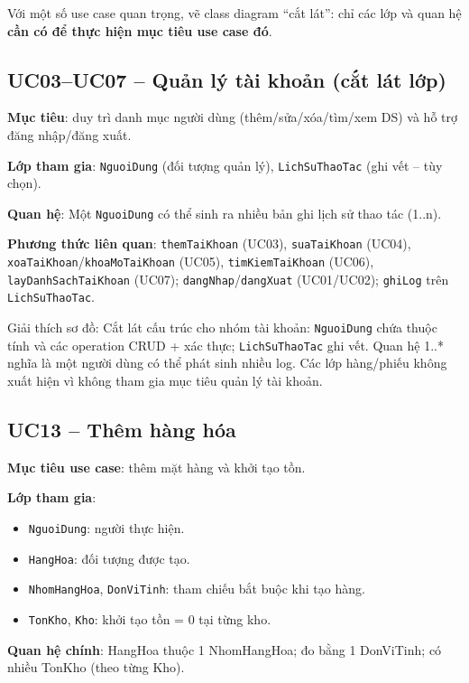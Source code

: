 Với một số use case quan trọng, vẽ class diagram ``cắt lát'': chỉ các lớp và quan hệ \textbf{cần có để thực hiện mục tiêu use case đó}.

\subsection{UC03--UC07 -- Quản lý tài khoản (cắt lát lớp)}

\textbf{Mục tiêu}: duy trì danh mục người dùng (thêm/sửa/xóa/tìm/xem DS) và hỗ trợ đăng nhập/đăng xuất.

\textbf{Lớp tham gia}: \texttt{NguoiDung} (đối tượng quản lý), \texttt{LichSuThaoTac} (ghi vết -- tùy chọn).

\textbf{Quan hệ}: Một \texttt{NguoiDung} có thể sinh ra nhiều bản ghi lịch sử thao tác (1..n).

\textbf{Phương thức liên quan}: \texttt{themTaiKhoan} (UC03), \texttt{suaTaiKhoan} (UC04), \texttt{xoaTaiKhoan}/\texttt{khoaMoTaiKhoan} (UC05), \texttt{timKiemTaiKhoan} (UC06), \texttt{layDanhSachTaiKhoan} (UC07); \texttt{dangNhap}/\texttt{dangXuat} (UC01/UC02); \texttt{ghiLog} trên \texttt{LichSuThaoTac}.



Giải thích sơ đồ: Cắt lát cấu trúc cho nhóm tài khoản: \texttt{NguoiDung} chứa thuộc tính và các operation CRUD + xác thực; \texttt{LichSuThaoTac} ghi vết. Quan hệ 1..* nghĩa là một người dùng có thể phát sinh nhiều log. Các lớp hàng/phiếu không xuất hiện vì không tham gia mục tiêu quản lý tài khoản.

\subsection{UC13 -- Thêm hàng hóa}

\textbf{Mục tiêu use case}: thêm mặt hàng và khởi tạo tồn.

\textbf{Lớp tham gia}:
\begin{itemize}[leftmargin=1.5cm]
    \item \texttt{NguoiDung}: người thực hiện.
    \item \texttt{HangHoa}: đối tượng được tạo.
    \item \texttt{NhomHangHoa}, \texttt{DonViTinh}: tham chiếu bắt buộc khi tạo hàng.
    \item \texttt{TonKho}, \texttt{Kho}: khởi tạo tồn = 0 tại từng kho.
\end{itemize}

\textbf{Quan hệ chính}: HangHoa thuộc 1 NhomHangHoa; đo bằng 1 DonViTinh; có nhiều TonKho (theo từng Kho).

